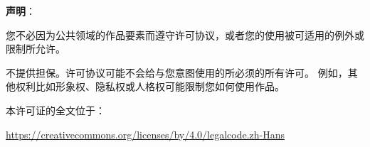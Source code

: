 \documentclass{../runikraft-report}
\begin{document}
\vspace{2ex}
\noindent\textbf{\large 声明}：

您不必因为公共领域的作品要素而遵守许可协议，或者您的使用被可适用的例外或限制所允许。

不提供担保。许可协议可能不会给与您意图使用的所必须的所有许可。
例如，其他权利比如形象权、隐私权或人格权可能限制您如何使用作品。

本许可证的全文位于：\\
\centerline{\url{https://creativecommons.org/licenses/by/4.0/legalcode.zh-Hans}}


\end{document}
